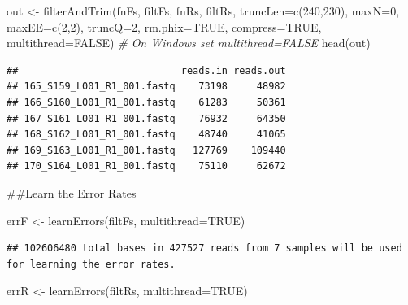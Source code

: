 \documentclass[
]{article}
\newenvironment{Shaded}{\begin{snugshade}}{\end{snugshade}}
\newcommand{\AttributeTok}[1]{\textcolor[rgb]{0.77,0.63,0.00}{#1}}
\newcommand{\CommentTok}[1]{\textcolor[rgb]{0.56,0.35,0.01}{\textit{#1}}}
\newcommand{\ConstantTok}[1]{\textcolor[rgb]{0.00,0.00,0.00}{#1}}
\newcommand{\DecValTok}[1]{\textcolor[rgb]{0.00,0.00,0.81}{#1}}
\newcommand{\FunctionTok}[1]{\textcolor[rgb]{0.00,0.00,0.00}{#1}}
\newcommand{\NormalTok}[1]{#1}
\newcommand{\OtherTok}[1]{\textcolor[rgb]{0.56,0.35,0.01}{#1}}
\begin{document}
\begin{Shaded}
\begin{Highlighting}[]
\NormalTok{out }\OtherTok{\textless{}{-}} \FunctionTok{filterAndTrim}\NormalTok{(fnFs, filtFs, fnRs, filtRs, }\AttributeTok{truncLen=}\FunctionTok{c}\NormalTok{(}\DecValTok{240}\NormalTok{,}\DecValTok{230}\NormalTok{),}
              \AttributeTok{maxN=}\DecValTok{0}\NormalTok{, }\AttributeTok{maxEE=}\FunctionTok{c}\NormalTok{(}\DecValTok{2}\NormalTok{,}\DecValTok{2}\NormalTok{), }\AttributeTok{truncQ=}\DecValTok{2}\NormalTok{, }\AttributeTok{rm.phix=}\ConstantTok{TRUE}\NormalTok{,}
              \AttributeTok{compress=}\ConstantTok{TRUE}\NormalTok{, }\AttributeTok{multithread=}\ConstantTok{FALSE}\NormalTok{) }\CommentTok{\# On Windows set multithread=FALSE}
\FunctionTok{head}\NormalTok{(out)}
\end{Highlighting}
\end{Shaded}

\begin{verbatim}
##                            reads.in reads.out
## 165_S159_L001_R1_001.fastq    73198     48982
## 166_S160_L001_R1_001.fastq    61283     50361
## 167_S161_L001_R1_001.fastq    76932     64350
## 168_S162_L001_R1_001.fastq    48740     41065
## 169_S163_L001_R1_001.fastq   127769    109440
## 170_S164_L001_R1_001.fastq    75110     62672
\end{verbatim}

\#\#Learn the Error Rates

\begin{Shaded}
\begin{Highlighting}[]
\NormalTok{errF }\OtherTok{\textless{}{-}} \FunctionTok{learnErrors}\NormalTok{(filtFs, }\AttributeTok{multithread=}\ConstantTok{TRUE}\NormalTok{)}
\end{Highlighting}
\end{Shaded}

\begin{verbatim}
## 102606480 total bases in 427527 reads from 7 samples will be used for learning the error rates.
\end{verbatim}

\begin{Shaded}
\begin{Highlighting}[]
\NormalTok{errR }\OtherTok{\textless{}{-}} \FunctionTok{learnErrors}\NormalTok{(filtRs, }\AttributeTok{multithread=}\ConstantTok{TRUE}\NormalTok{)}
\end{Highlighting}
\end{Shaded}
\end{document}
